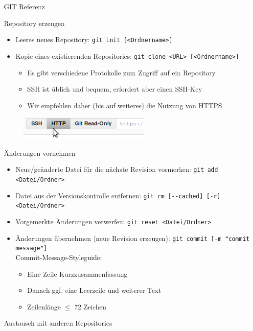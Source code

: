 \begin{frame}{GIT Referenz}
	\begin{block}{Repository erzeugen}
		\begin{itemize}
			\item Leeres neues Repository: \verb|git init [<Ordnername>]|
			\item Kopie eines existierenden Repositories: \verb|git clone <URL> [<Ordnername>]|
			\begin{itemize}
				\item Es gibt verschiedene Protokolle zum Zugriff auf ein Repository
				\item SSH ist üblich und bequem, erfordert aber einen SSH-Key
				\item Wir empfehlen daher (bis auf weiteres) die Nutzung von HTTPS
			\end{itemize}
		\end{itemize}
		\begin{figure}
			\includegraphics[width=0.5\linewidth]{images/https.png}
		\end{figure}
	\end{block}
	\begin{block}{Änderungen vornehmen}
		\begin{itemize}
			\item Neue/geänderte Datei für die nächste Revision vormerken: \verb|git add <Datei/Ordner>|
			\item Datei aus der Versionskontrolle entfernen: \verb|git rm [--cached] [-r] <Datei/Ordner>|
			\item Vorgemerkte Änderungen verwerfen: \verb|git reset <Datei/Ordner>|
			\item Änderungen übernehmen (neue Revision erzeugen): \verb|git commit [-m "commit message"]| \\
				Commit-Message-Styleguide:
			\begin{itemize}
				\item Eine Zeile Kurzzusammenfassung
				\item Danach ggf. eine Leerzeile und weiterer Text
				\item Zeilenlänge $\le$ 72 Zeichen
			\end{itemize}
		\end{itemize}
	\end{block}
	\begin{block}{Austausch mit anderen Repositories}

\end{block}
\end{frame}
